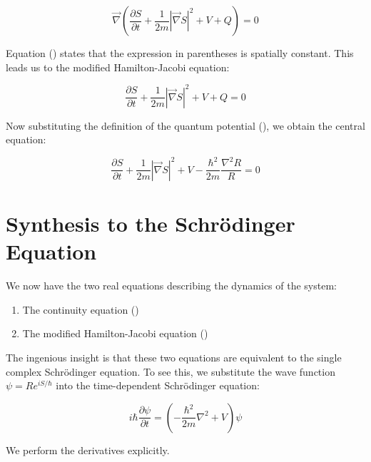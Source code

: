 \begin{equation}
    \label{eq:zwischenstand}
    \vec{\nabla} \left( \frac{\partial S}{\partial t} + \frac{1}{2m} \left| \vec{\nabla} S \right|^2 + V + Q \right) = 0
\end{equation}

Equation () states that the expression in parentheses is spatially constant. This leads us to the modified Hamilton-Jacobi equation:

\begin{equation}
    \frac{\partial S}{\partial t} + \frac{1}{2m} \left| \vec{\nabla} S \right|^2 + V + Q = 0
\end{equation}

Now substituting the definition of the quantum potential (), we obtain the central equation:

\begin{equation}
    \label{eq:modifizierte_hamilton_jacobi}
    \frac{\partial S}{\partial t} + \frac{1}{2m} \left| \vec{\nabla} S \right|^2 + V - \frac{\hbar^2}{2m} \frac{\nabla^2 R}{R} = 0
\end{equation}

\section{Synthesis to the Schrödinger Equation}
\label{sec:schrödinger_gleichung}
We now have the two real equations describing the dynamics of the system:

\begin{enumerate}
    \item The continuity equation ()
    \item The modified Hamilton-Jacobi equation ()
\end{enumerate}

The ingenious insight is that these two equations are equivalent to the single complex Schrödinger equation. To see this, we substitute the wave function $\psi = R e^{iS/\hbar}$ into the time-dependent Schrödinger equation:

\begin{equation}
    \label{eq:schrödinger_gleichung}
    i\hbar \frac{\partial \psi}{\partial t} = \left( -\frac{\hbar^2}{2m} \nabla^2 + V \right) \psi
\end{equation}

We perform the derivatives explicitly.

